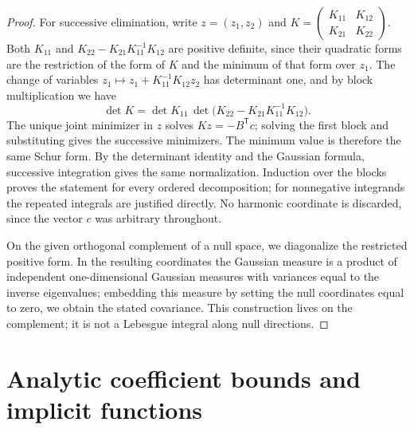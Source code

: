 \begin{proof}
For successive elimination, write $z=(z_1,z_2)$ and $K=\left(\begin{smallmatrix}K_{11}&K_{12}\\K_{21}&K_{22}\end{smallmatrix}\right)$. Both $K_{11}$ and $K_{22}-K_{21}K_{11}^{-1}K_{12}$ are positive definite, since their quadratic forms are the restriction of the form of $K$ and the minimum of that form over $z_1$. The change of variables $z_1\mapsto z_1+K_{11}^{-1}K_{12}z_2$ has determinant one, and by block multiplication we have
\[
 \det K=\det K_{11}\,\det\bigl(K_{22}-K_{21}K_{11}^{-1}K_{12}\bigr).
\]
The unique joint minimizer in $z$ solves $Kz=-B^{\mathsf T}c$; solving the first block and substituting gives the successive minimizers. The minimum value is therefore the same Schur form. By the determinant identity and the Gaussian formula, successive integration gives the same normalization. Induction over the blocks proves the statement for every ordered decomposition; for nonnegative integrands the repeated integrals are justified directly. No harmonic coordinate is discarded, since the vector $c$ was arbitrary throughout.

On the given orthogonal complement of a null space, we diagonalize the restricted positive form. In the resulting coordinates the Gaussian measure is a product of independent one-dimensional Gaussian measures with variances equal to the inverse eigenvalues; embedding this measure by setting the null coordinates equal to zero, we obtain the stated covariance. This construction lives on the complement; it is not a Lebesgue integral along null directions.
\end{proof}

\section{Analytic coefficient bounds and implicit functions}\label{ch02:sec:coefficients}

